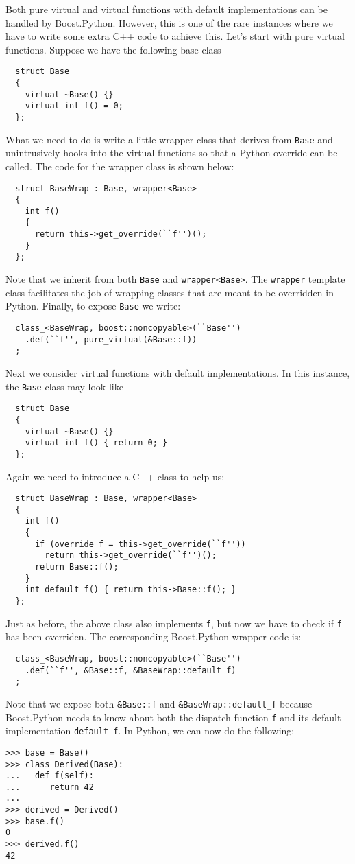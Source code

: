 Both pure virtual and virtual functions with default implementations can be handled by Boost.Python. However, this is one of the rare instances where we have to 
write some extra C++ code to achieve this. Let's start with pure virtual functions. Suppose we have the following base class
\begin{verbatim}
  struct Base
  {
    virtual ~Base() {}
    virtual int f() = 0;
  };
\end{verbatim} 
What we need to do is write a little wrapper class that derives from \verb|Base| and unintrusively hooks into the virtual functions so that a Python override can be called. The code for the wrapper class is shown below:
\begin{verbatim}
  struct BaseWrap : Base, wrapper<Base>
  {
    int f()
    { 
      return this->get_override(``f'')();
    }
  };
\end{verbatim}
Note that we inherit from both \verb|Base| and \verb|wrapper<Base>|. The \verb|wrapper| template class facilitates the job of wrapping classes that are meant to be overridden in Python. Finally, to expose \verb|Base| we write:
\begin{verbatim}
  class_<BaseWrap, boost::noncopyable>(``Base'')
    .def(``f'', pure_virtual(&Base::f))
  ;
\end{verbatim}
Next we consider virtual functions with default implementations. In this instance, the \verb|Base| class may look like
\begin{verbatim}
  struct Base
  {
    virtual ~Base() {}
    virtual int f() { return 0; }
  };
\end{verbatim} 
Again we need to introduce a C++ class to help us:
\begin{verbatim}
  struct BaseWrap : Base, wrapper<Base>
  {
    int f()
    { 
      if (override f = this->get_override(``f''))
        return this->get_override(``f'')();
      return Base::f();
    }
    int default_f() { return this->Base::f(); }
  };
\end{verbatim}
Just as before, the above class also implements \verb|f|, but now we have to check if \verb|f| has been overriden. The corresponding Boost.Python wrapper code is:
\begin{verbatim}
  class_<BaseWrap, boost::noncopyable>(``Base'')
    .def(``f'', &Base::f, &BaseWrap::default_f)
  ;
\end{verbatim}
Note that we expose both \verb|&Base::f| and \verb|&BaseWrap::default_f| because Boost.Python needs to know about both the dispatch function \verb|f| and its default implementation \verb|default_f|. In Python, we can now do the following:
\begin{verbatim}
>>> base = Base()
>>> class Derived(Base):
...   def f(self):
...      return 42
...
>>> derived = Derived()
>>> base.f()
0
>>> derived.f()
42
\end{verbatim}
 
